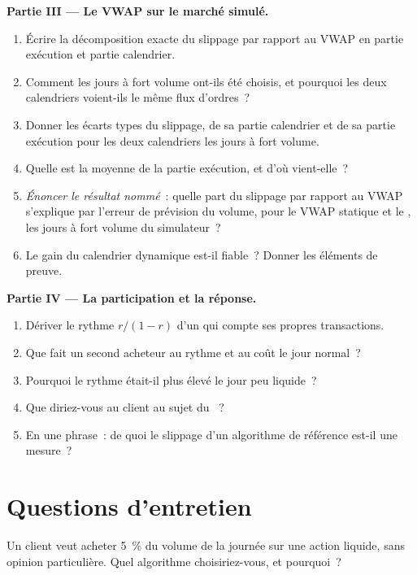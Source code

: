 \begin{problem}
\medskip\noindent\textbf{Partie III --- Le VWAP sur le marché simulé.}
\begin{enumerate}[resume]
\item Écrire la décomposition exacte du slippage par rapport au VWAP en partie exécution et partie calendrier.
\item Comment les jours à fort volume ont-ils été choisis, et pourquoi les deux calendriers voient-ils le même flux d'ordres~?
\item Donner les écarts types du slippage, de sa partie calendrier et de sa partie exécution pour les deux calendriers les jours à fort volume.
\item Quelle est la moyenne de la partie exécution, et d'où vient-elle~?
\item \emph{Énoncer le résultat nommé}~: quelle part du slippage par rapport au VWAP s'explique par l'erreur de prévision du volume,
pour le VWAP statique et le , les jours à fort volume du simulateur~?
\item Le gain du calendrier dynamique est-il fiable~? Donner les éléments de preuve.
\end{enumerate}

\medskip\noindent\textbf{Partie IV --- La participation et la réponse.}
\begin{enumerate}[resume]
\item Dériver le rythme $r/(1-r)$ d'un  qui compte ses propres transactions.
\item Que fait un second acheteur au rythme et au coût le jour normal~?
\item Pourquoi le rythme était-il plus élevé le jour peu liquide~?
\item Que diriez-vous au client au sujet du ~?
\item En une phrase~: de quoi le slippage d'un algorithme de référence est-il une mesure~?
\end{enumerate}
\end{problem}

\section{Questions d'entretien}

\begin{interviewq}\label{iq:mx:benchmark-algorithms:1}
Un client veut acheter 5~\% du volume de la journée sur une action liquide, sans opinion particulière. Quel algorithme choisiriez-vous, et pourquoi~?
\end{interviewq}

